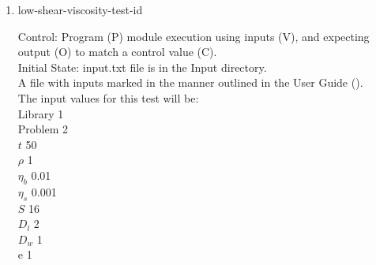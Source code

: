 \documentclass[12pt, titlepage]{article}
\newcommand{\famname}{Lattice Boltzmann Solver}
\newcounter{testcounter} %
\begin{document}
\begin{enumerate}
A file with inputs marked in the manner outlined in the User
Guide (\citet{LBM_UserGuide_PM}).\\The input values for this test will be:\\
Library 1\\
Problem 2\\
$t$ 50\\
$\rho$ 1\\
$\eta_b$ 20000\\
$\eta_s$ 0.01\\
$S$ 16\\
$D_{l}$ 2\\
$D_{w}$ 1\\
$\mathrm{e}$ 1\\

Output: Pressure gradient value printed to the screen.  \\

Test Case Derivation: This case is a comparison with the pseudo-oracle pyLBM,
which has a module for Poiseuille Flow. The output pressure gradient value of
this test is to be compared to the C value from the pseudo-oracle,
-3.262e-03.\

How test will be performed: 

\begin{enumerate}
\item Outside of the system, the input parameter values will be written to a text file titled input.txt, as outlined in the User Guide.
\item The file will be placed into the Input directory, under the home directory
of the project.
\item {\famname} shall be run.
\item Upon completion of the module, the pressure gradient output value will be
compared to the above output value from the pseudo-oracle.
\end{enumerate}	

\item{low-shear-viscosity-test-id\thetestcounter \\}

Control: Program (P) module execution using inputs (V), and expecting output (O) to match a control value (C).\\
					
Initial State: input.txt file is in the Input directory.\\
					
A file with inputs marked in the manner outlined in the User
Guide (\citet{LBM_UserGuide_PM}).\\The input values for this test will be:\\
Library 1\\
Problem 2\\
$t$ 50\\
$\rho$ 1\\
$\eta_b$ 0.01\\
$\eta_s$ 0.001\\
$S$ 16\\
$D_{l}$ 2\\
$D_{w}$ 1\\
$\mathrm{e}$ 1\\



\end{enumerate}
\end{document}
